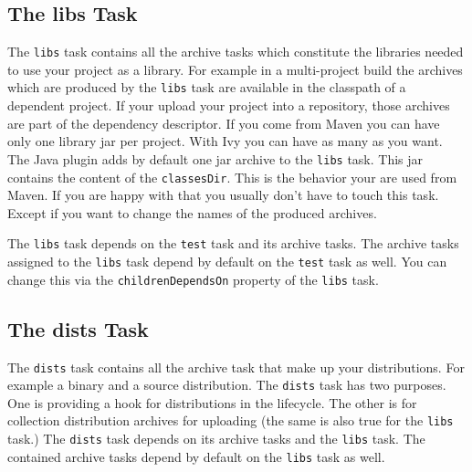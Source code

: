 \subsection{The libs Task} %
\label{sub:the_libs_task}
The \texttt{libs} task contains all the archive tasks which constitute the libraries needed to use your project as a library. For example in a multi-project build the archives which are produced by the \texttt{libs} task are available in the classpath of a dependent project. If your upload your project into a repository, those archives are part of the dependency descriptor. If you come from Maven you can have only one library jar per project. With Ivy you can have as many as you want. 
The Java plugin adds by default one jar archive to the \texttt{libs} task. This jar contains the content of the \texttt{classesDir}. This is the behavior your are used from Maven. If you are happy with that you usually don't have to touch this task. Except if you want to change the names of the produced archives. 

The \texttt{libs} task depends on the \texttt{test} task and its archive tasks. The archive tasks assigned to the \texttt{libs} task depend by default on the \texttt{test} task as well. You can change this via the \texttt{childrenDependsOn} property of the \texttt{libs} task. 
\subsection{The dists Task} %
\label{sub:the_dists_task}
The \texttt{dists} task contains all the archive task that make up your distributions. For example a binary and a source distribution. The \texttt{dists} task has two purposes. One is providing a hook for distributions in the lifecycle. The other is for collection distribution archives for uploading (the same is also true for the \texttt{libs} task.) The \texttt{dists} task depends on its archive tasks and the \texttt{libs} task. The contained archive tasks depend by default on the \texttt{libs} task as well.
